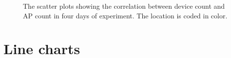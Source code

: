\begin{figure}[H]
\begin{adjustwidth}{-1cm}{}
{{    }
  }
  \end{adjustwidth}
  \caption[The scatter plots of the correlation between device count and \ac{AP} count.]
  {The scatter plots showing the correlation between device count and \ac{AP} count in four days of experiment. The location is coded in color.}
  \label{fig:hc-dc-scatterplot}
\end{figure}







\section{Line charts} %
\label{sec:line_charts}

